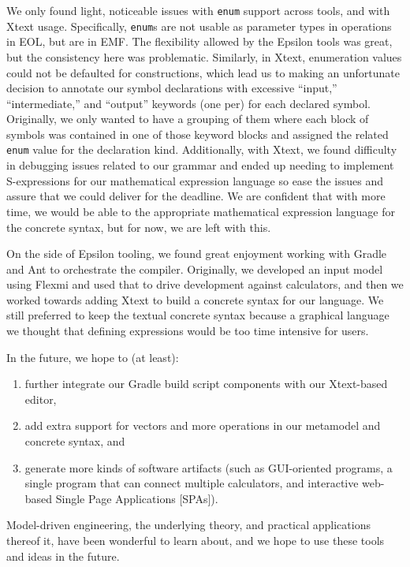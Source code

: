 \documentclass[11pt,fleqn]{article}
\begin{document}
We only found light, noticeable issues with \lstinline{enum} support across
tools, and with Xtext usage. Specifically, \lstinline{enum}s are not usable as
parameter types in operations in EOL, but are in EMF. The flexibility allowed by
the Epsilon tools was great, but the consistency here was problematic.
Similarly, in Xtext, enumeration values could not be defaulted for
constructions, which lead us to making an unfortunate decision to annotate our
symbol declarations with excessive ``input,'' ``intermediate,'' and ``output''
keywords (one per) for each declared symbol. Originally, we only wanted to have
a grouping of them where each block of symbols was contained in one of those
keyword blocks and assigned the related \lstinline{enum} value for the
declaration kind. Additionally, with Xtext, we found difficulty in debugging
issues related to our grammar and ended up needing to implement S-expressions
for our mathematical expression language so ease the issues and assure that we
could deliver for the deadline. We are confident that with more time, we would
be able to the appropriate mathematical expression language for the concrete
syntax, but for now, we are left with this.

On the side of Epsilon tooling, we found great enjoyment working with Gradle and
Ant to orchestrate the compiler. Originally, we developed an input model using
Flexmi and used that to drive development against calculators, and then we
worked towards adding Xtext to build a concrete syntax for our language. We
still preferred to keep the textual concrete syntax because a graphical language
we thought that defining expressions would be too time intensive for users.

In the future, we hope to (at least):

\begin{enumerate}
  \item further integrate our Gradle build script components with our
        Xtext-based editor,
  \item add extra support for vectors and more operations in our metamodel and
        concrete syntax, and
  \item generate more kinds of software artifacts (such as GUI-oriented
        programs, a single program that can connect multiple calculators, and
        interactive web-based Single Page Applications [SPAs]).
\end{enumerate}

Model-driven engineering, the underlying theory, and practical applications
thereof it, have been wonderful to learn about, and we hope to use these tools
and ideas in the future.
\end{document}
